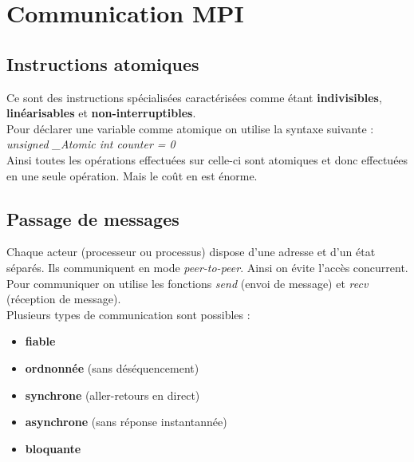 \documentclass[12pt, a4paper]{article}
\begin{document}
  \section{Communication MPI}
    \subsection{Instructions atomiques}
      Ce sont des instructions spécialisées caractérisées comme étant
      \textbf{indivisibles}, \textbf{linéarisables} et
      \textbf{non-interruptibles}. \\
      Pour déclarer une variable comme atomique on utilise la syntaxe suivante :
      \textit{unsigned \_Atomic int counter = 0} \\
      Ainsi toutes les opérations effectuées sur celle-ci sont atomiques et donc
      effectuées en une seule opération. Mais le coût en est énorme.
    \subsection{Passage de messages}
      Chaque acteur (processeur ou processus) dispose d'une adresse et d'un état
      séparés. Ils communiquent en mode \textit{peer-to-peer}. Ainsi on évite
      l'accès concurrent. \\
      Pour communiquer on utilise les fonctions \textit{send} (envoi de message)
       et \textit{recv} (réception de message). \\
      Plusieurs types de communication sont possibles :
      \begin{itemize}
        \item \textbf{fiable}
        \item \textbf{ordnonnée} (sans déséquencement)
        \item \textbf{synchrone} (aller-retours en direct)
        \item \textbf{asynchrone} (sans réponse instantannée)
        \item \textbf{bloquante}
      \end{itemize}
\end{document}
